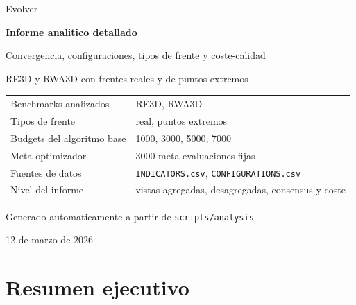\documentclass[11pt,a4paper]{article}
\begin{document}
\hypersetup{pageanchor=false}

\begin{titlepage}

\centering

\vspace*{2.3cm}

{\Large Evolver\\[0.4cm]}

{\Huge\bfseries Informe analitico detallado\\[0.35cm]}

{\Large Convergencia, configuraciones, tipos de frente y coste-calidad\\[1.6cm]}

{\large RE3D y RWA3D con frentes reales y de puntos extremos\\[2.2cm]}

\begin{tabular}{ll}

Benchmarks analizados & RE3D, RWA3D\\

Tipos de frente & real, puntos extremos\\

Budgets del algoritmo base & 1000, 3000, 5000, 7000\\

Meta-optimizador & 3000 meta-evaluaciones fijas\\

Fuentes de datos & \texttt{INDICATORS.csv}, \texttt{CONFIGURATIONS.csv}\\

Nivel del informe & vistas agregadas, desagregadas, consensus y coste\\

\end{tabular}

\vfill

{\large Generado automaticamente a partir de \texttt{scripts/analysis}\\}

{\large 12 de marzo de 2026\\}

\end{titlepage}

\clearpage

\hypersetup{pageanchor=true}


\section*{Resumen ejecutivo}
\end{document}
